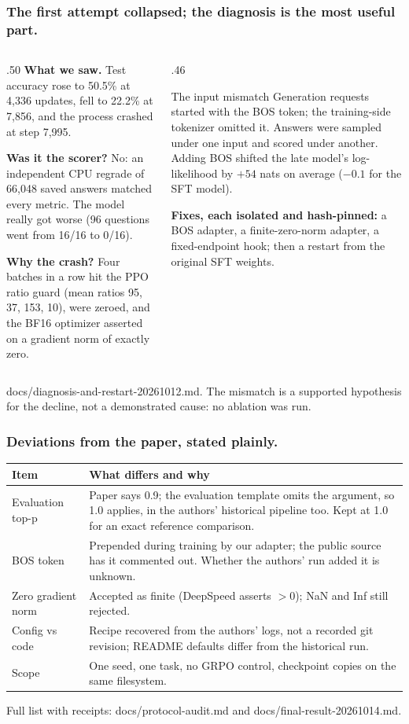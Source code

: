 \documentclass[aspectratio=169,11pt]{beamer}
\newcommand{\source}[1]{\vfill{\scriptsize\color{Gray}#1\par}}
\begin{document}
\begin{frame}[t]
\frametitle{The first attempt collapsed; the diagnosis is the most useful part.}
\small
\begin{columns}[T,onlytextwidth]
\begin{column}{.50\textwidth}
\textbf{What we saw.} Test accuracy rose to 50.5\% at 4,336 updates, fell to
\alert{22.2\%} at 7,856, and the process crashed at step 7,995.
\medskip

\textbf{Was it the scorer?} No: an independent CPU regrade of 66,048 saved answers matched
every metric. The model really got worse (96 questions went from 16/16 to 0/16).
\medskip

\textbf{Why the crash?} Four batches in a row hit the PPO ratio guard (mean ratios 95, 37,
153, 10), were zeroed, and the BF16 optimizer asserted on a gradient norm of exactly zero.
\end{column}
\begin{column}{.46\textwidth}
\begin{block}{The input mismatch}
Generation requests started with the BOS token; the training-side tokenizer omitted it.
Answers were sampled under one input and scored under another. Adding BOS shifted the
late model's log-likelihood by $+54$ nats on average ($-0.1$ for the SFT model).
\end{block}
\medskip
\textbf{Fixes, each isolated and hash-pinned:} a BOS adapter, a finite-zero-norm adapter,
a fixed-endpoint hook; then a restart from the original SFT weights.
\end{column}
\end{columns}
\source{docs/diagnosis-and-restart-20261012.md. The mismatch is a supported hypothesis for the decline, not a demonstrated cause: no ablation was run.}
\end{frame}

\begin{frame}[t]
\frametitle{Deviations from the paper, stated plainly.}
\begin{tabular}{@{}>{\raggedright\arraybackslash}p{}>{\raggedright\arraybackslash}p{}@{}}
\toprule
Item & What differs and why\\
\midrule
Evaluation top-p & Paper says 0.9; the evaluation template omits the argument, so 1.0 applies, in the authors' historical pipeline too. Kept at 1.0 for an exact reference comparison.\\[1mm]
BOS token & Prepended during training by our adapter; the public source has it commented out. Whether the authors' run added it is unknown.\\[1mm]
Zero gradient norm & Accepted as finite (DeepSpeed asserts $>0$); NaN and Inf still rejected.\\[1mm]
Config vs code & Recipe recovered from the authors' logs, not a recorded git revision; README defaults differ from the historical run.\\[1mm]
Scope & One seed, one task, no GRPO control, checkpoint copies on the same filesystem.\\
\bottomrule
\end{tabular}
\source{Full list with receipts: docs/protocol-audit.md and docs/final-result-20261014.md.}
\end{frame}
\end{document}
